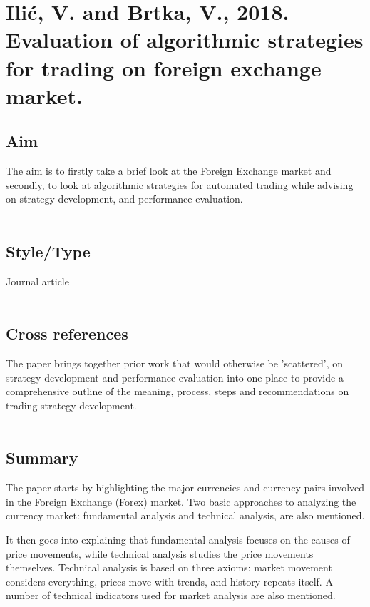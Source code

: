 \documentclass{article}
\begin{document}
\section{Ilić, V. and Brtka, V., 2018. Evaluation of algorithmic strategies for trading on foreign exchange market.}
    \justify
    \setlength{\parindent}{1em} %
    \subsection*{Aim}
    The aim is to firstly take a brief look at the Foreign Exchange market and secondly, to look at algorithmic strategies for automated trading while advising on strategy development, and performance evaluation.\\\\
    
    \subsection*{Style/Type}
    Journal article\\\\
    
    \subsection*{Cross references}
    The paper brings together prior work that would otherwise be 'scattered', on strategy development and performance evaluation into one place to provide a comprehensive outline of the meaning, process, steps and recommendations on trading strategy development.\\\\
    
    \subsection*{Summary}
    The paper starts by highlighting the major currencies and currency pairs involved in the Foreign Exchange (Forex) market. Two basic approaches to analyzing the currency market: fundamental analysis and technical analysis, are also mentioned.
    
    It then goes into explaining that fundamental analysis focuses on the causes of price movements, while technical analysis studies the price movements themselves. Technical analysis is based on three axioms: market movement considers everything, prices move with trends, and history repeats itself. A number of technical indicators used for market analysis are also mentioned.
    
\end{document}
